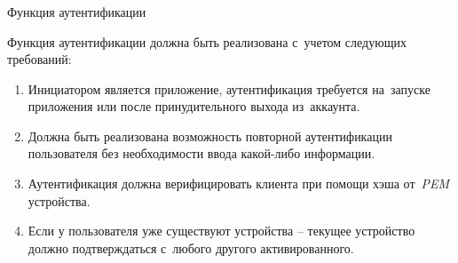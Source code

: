 \subsubsection{} Функция аутентификации
\label{sec:analysis:research:funcreq:auth}

Функция аутентификации должна быть реализована с~учетом следующих требований:

\begin{enumerate}
	\item Инициатором является приложение, аутентификация требуется на~запуске приложения или после принудительного выхода из~аккаунта.
	\item Должна быть реализована возможность повторной аутентификации пользователя без необходимости ввода какой-либо информации.
	\item Аутентификация должна верифицировать клиента при помощи хэша от~\textit{PEM} устройства.
	\item Если у пользователя уже существуют устройства -- текущее устройство должно подтверждаться с~любого другого активированного.
\end{enumerate}